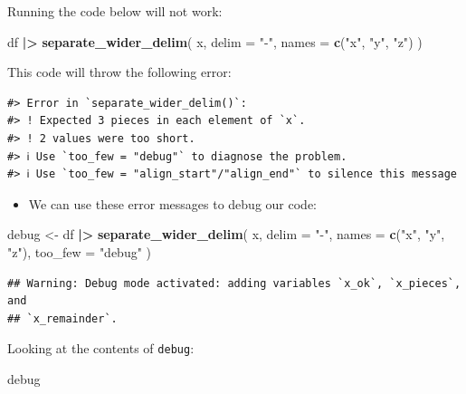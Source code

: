 \documentclass[
]{article}
\newenvironment{Shaded}{\begin{snugshade}}{\end{snugshade}}
\newcommand{\AttributeTok}[1]{\textcolor[rgb]{0.13,0.29,0.53}{#1}}
\newcommand{\FunctionTok}[1]{\textcolor[rgb]{0.13,0.29,0.53}{\textbf{#1}}}
\newcommand{\NormalTok}[1]{#1}
\newcommand{\OtherTok}[1]{\textcolor[rgb]{0.56,0.35,0.01}{#1}}
\newcommand{\SpecialCharTok}[1]{\textcolor[rgb]{0.81,0.36,0.00}{\textbf{#1}}}
\newcommand{\StringTok}[1]{\textcolor[rgb]{0.31,0.60,0.02}{#1}}
\providecommand{\tightlist}{%
  \setlength{\itemsep}{0pt}\setlength{\parskip}{0pt}}
\begin{document}
Running the code below will not work:

\begin{Shaded}
\begin{Highlighting}[]
\NormalTok{df }\SpecialCharTok{|\textgreater{}} 
  \FunctionTok{separate\_wider\_delim}\NormalTok{(}
\NormalTok{    x,}
    \AttributeTok{delim =} \StringTok{"{-}"}\NormalTok{,}
    \AttributeTok{names =} \FunctionTok{c}\NormalTok{(}\StringTok{"x"}\NormalTok{, }\StringTok{"y"}\NormalTok{, }\StringTok{"z"}\NormalTok{)}
\NormalTok{  )}
\end{Highlighting}
\end{Shaded}

This code will throw the following error:

\begin{verbatim}
#> Error in `separate_wider_delim()`:
#> ! Expected 3 pieces in each element of `x`.
#> ! 2 values were too short.
#> ℹ Use `too_few = "debug"` to diagnose the problem.
#> ℹ Use `too_few = "align_start"/"align_end"` to silence this message
\end{verbatim}

\begin{itemize}
\tightlist
\item
  We can use these error messages to debug our code:
\end{itemize}

\begin{Shaded}
\begin{Highlighting}[]
\NormalTok{debug }\OtherTok{\textless{}{-}}\NormalTok{ df }\SpecialCharTok{|\textgreater{}} 
  \FunctionTok{separate\_wider\_delim}\NormalTok{(}
\NormalTok{    x,}
    \AttributeTok{delim =} \StringTok{"{-}"}\NormalTok{,}
    \AttributeTok{names =} \FunctionTok{c}\NormalTok{(}\StringTok{"x"}\NormalTok{, }\StringTok{"y"}\NormalTok{, }\StringTok{"z"}\NormalTok{),}
    \AttributeTok{too\_few =} \StringTok{"debug"}
\NormalTok{  )}
\end{Highlighting}
\end{Shaded}

\begin{verbatim}
## Warning: Debug mode activated: adding variables `x_ok`, `x_pieces`, and
## `x_remainder`.
\end{verbatim}

Looking at the contents of \texttt{debug}:

\begin{Shaded}
\begin{Highlighting}[]
\NormalTok{debug}
\end{Highlighting}
\end{Shaded}
\end{document}

